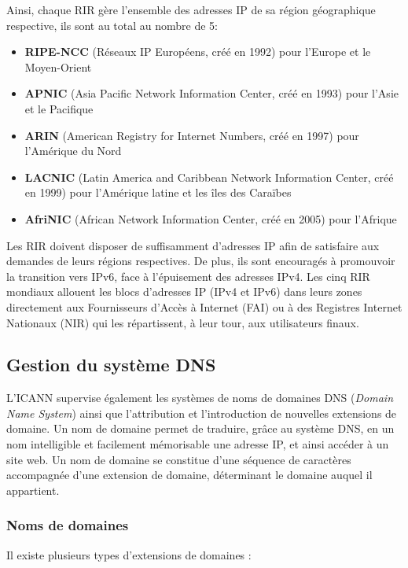 \documentclass{cs-mpi}
\begin{document}
Ainsi, chaque RIR gère l'ensemble des adresses IP de sa région géographique respective, ils sont au total au nombre de 5:

\begin{itemize}
    \item \textbf{RIPE-NCC} (Réseaux IP Européens, créé en 1992) pour l'Europe et le Moyen-Orient
    \item \textbf{APNIC} (Asia Pacific Network Information Center, créé en 1993) pour l'Asie et le Pacifique
    \item \textbf{ARIN} (American Registry for Internet Numbers, créé en 1997) pour l'Amérique du Nord
    \item \textbf{LACNIC} (Latin America and Caribbean Network Information Center, créé en 1999) pour l'Amérique latine et les îles des Caraïbes
    \item \textbf{AfriNIC} (African Network Information Center, créé en 2005) pour l'Afrique
\end{itemize}

Les RIR doivent disposer de suffisamment d'adresses IP afin de satisfaire aux demandes de leurs régions respectives. De plus, ils sont encouragés à promouvoir la transition vers IPv6, face à l'épuisement des adresses IPv4. Les cinq RIR mondiaux allouent les blocs d’adresses IP (IPv4 et IPv6) dans leurs zones directement aux Fournisseurs d'Accès à Internet (FAI) ou à des Registres Internet Nationaux (NIR) qui les répartissent, à leur tour, aux utilisateurs finaux.

\subsection{Gestion du système DNS}
L'ICANN supervise également les systèmes de noms de domaines DNS (\emph{Domain Name System}) ainsi que l'attribution et l'introduction de nouvelles extensions de domaine.
Un nom de domaine permet de traduire, grâce au système DNS, en un nom intelligible et facilement mémorisable une adresse IP, et ainsi accéder à un site web. 
Un nom de domaine se constitue d'une séquence de caractères accompagnée d'une extension de domaine, déterminant le domaine auquel il appartient.
\subsubsection{Noms de domaines}
Il existe plusieurs types d’extensions de domaines : 
\end{document}

